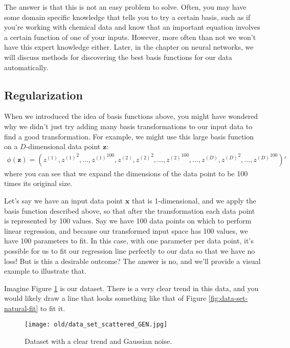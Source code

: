 The answer is that this is not an easy problem to solve. Often, you may have some domain specific knowledge that tells you to try a certain basis, such as if you're working with chemical data and know that an important equation involves a certain function of one of your inputs. However, more often than not we won't have this expert knowledge either. Later, in the chapter on neural networks, we will discuss methods for discovering the best basis functions for our data automatically.

\subsection{Regularization}
When we introduced the idea of basis functions above, you might have wondered why we didn't just try adding many basis transformations to our input data to find a good transformation. For example, we might use this large basis function on a $D$-dimensional data point $\bm{z}$:
\begin{align*}
    \phi(\bm{z}) = (z^{(1)}, {z^{(1)}}^{2}, ..., {z^{(1)}}^{100}, z^{(2)}, {z^{(2)}}^{2}, ..., {z^{(2)}}^{100}, ..., z^{(D)}, {z^{(D)}}^{2}, ..., {z^{(D)}}^{100})'
\end{align*}
where you can see that we expand the dimensions of the data point to be 100 times its original size.

Let's say we have an input data point $\bm{x}$ that is 1-dimensional, and we apply the basis function described above, so that after the transformation each data point is represented by 100 values. Say we have 100 data points on which to perform linear regression, and because our transformed input space has 100 values, we have 100 parameters to fit. In this case, with one parameter per data point, it's possible for us to fit our regression line perfectly to our data so that we have no loss! But is this a desirable outcome? The answer is no, and we'll provide a visual example to illustrate that.

Imagine Figure \ref{fig:data-set-scattered} is our dataset. There is a very clear trend in this data, and you would likely draw a line that looks something like that of Figure \ref{fig:data-set-natural-fit} to fit it.

\begin{figure}
    \centering
    \texttt{[image: old/data\_set\_scattered\_GEN.jpg]}
    \caption{Dataset with a clear trend and Gaussian noise.}
    \label{fig:data-set-scattered}
\end{figure}

